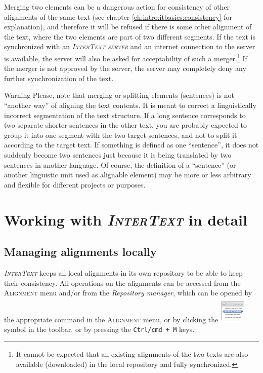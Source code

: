 \documentclass[a4paper,10pt,oneside]{book}
\newcommand{\IT}{\textit{\textsc{InterText}}\xspace}
\newcommand{\ITserver}{\textit{\textsc{InterText server}}\xspace}
\newcommand{\keys}[1]{\texttt{#1}}
\newcommand{\menu}[1]{\textsc{#1}}
\begin{document}
Merging two elements can be a dangerous action for consistency of other alignments of the same text (see chapter \ref{ch:intro:itbasics:consistency} for explanation), and therefore it will be refused if there is some other alignment of the text, where the two elements are part of two different segments. If the text is synchronized with an \ITserver and an internet connection to the server is available, the server will also be asked for acceptability of such a merger.\footnote{It cannot be expected that all existing alignments of the two texts are also available (downloaded) in the local repository and fully synchronized.} If the merger is not approved by the server, the server may completely deny any further synchronization of the text.

\medskip
\begin{bclogo}[couleur = blue!30, arrondi = 0.1, logo = \bcattention,
ombre = true , epOmbre = 0.125, couleurOmbre = black!30, blur, epBord = 0.3, marge = 5]{Warning}\small
Please, note that merging or splitting elements (sentences) is not ``another way'' of aligning the text contents. It is meant to correct a linguistically incorrect segmentation of the text structure. If a long sentence corresponds to two separate shorter sentences in the other text, you are probably expected to group it into one segment with the two target sentences, and not to split it according to the target text. If something is defined as one ``sentence'', it does not suddenly become two sentences just because it is being translated by two sentences in another language. Of course, the definition of a ``sentence'' (or another linguistic unit used as alignable element) may be more or less arbitrary and flexible for different projects or purposes.
\end{bclogo}

\part{Working with \IT in detail}\label{p:detail}

\chapter{Managing alignments locally}\label{ch:detail:managing_local}

\IT keeps all local alignments in its own repository to be able to keep their consistency. All operations on the alignments can be accessed from the \menu{Alignment} menu and/or from the \emph{Repository manager}, which can be opened by the appropriate command in the \menu{Alignment} menu, or by clicking the \includegraphics[height=2ex]{../images/48/manager.png} symbol in the toolbar, or by pressing the \keys{Ctrl/cmd + M} keys.
\end{document}
